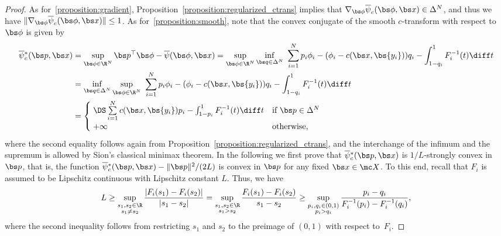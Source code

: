\documentclass[11pt, a4paper, oneside, reqno]{article}
\begin{document}
	\begin{proof}
		As for~\ref{proposition:gradient},  Proposition~\ref{proposition:regularized_ctrans} implies that $\nabla_{\bs \phi} \overline\psi_c(\bs \phi, \bs x) \in \Delta^N$, and thus we have $\| \nabla_{\bs \phi} \overline\psi_c(\bs \phi, \bs x) \| \leq 1$. As for~\ref{proposition:smooth}, note that the convex conjugate of the smooth $c$-transform with respect to $\bs \phi$ is given by
		\begin{align*}
		\overline\psi{}_c^*(\bs p, \bs x) &= \sup_{\bs \phi \in \R^N} \bs p^\top \bs \phi - \overline\psi(\bs \phi, \bs x) = \sup_{\bs \phi \in \R^N} \inf_{\bs q \in \Delta^N} ~ \sum_{i=1}^N p_i \phi_i - (\phi_i - c(\bs x, \bs {y_i})) q_i - \int_{1-q_i}^1 F_i^{-1}(t)\diff t \\
		&= \inf_{\bs q \in \Delta^N} \sup_{\bs \phi \in \R^N} ~ \sum_{i=1}^N p_i \phi_i - (\phi_i - c(\bs x, \bs {y_i})) q_i - \int_{1-q_i}^1 F_i^{-1}(t)\diff t \\
		&= \begin{cases}
		\;\DS \sum\limits_{i=1}^N c(\bs x, \bs {y_i}) p_i - \int_{1-p_i}^1 F_i^{-1}(t)\diff t &  \text{if } \bs p \in \Delta^N \\
		\;+\infty &  \text{otherwise,}
		\end{cases}
		\end{align*}
		where the second equality follows again from Proposition~\ref{proposition:regularized_ctrans}, and the interchange of the infimum and the supremum is allowed by Sion's classical minimax theorem. 
		In the following we first prove that $\overline\psi{}_c^*(\bs p, \bs x)$ is $1/L$-strongly convex in $\bs p$, that is, the function $\overline\psi{}_c^*(\bs p, \bs x) -  \| \bs p\|^2/ (2L)$ is convex in $\bs p$ for any fixed $\bs x \in \mc X$.
		To this end, recall that $F_i$ is assumed to be Lipschitz continuous with Lipschitz constant $L$. Thus, we have
		\begin{align*}
		    L\ge  \sup_{\substack{s_1,s_2 \in \R\\ s_1 \neq s_2}}\frac{\left| F_i (s_1) - F_i(s_2)\right|}{|s_1 - s_2|} 
	    	= \sup_{\substack{s_1, s_2 \in \R\\ s_1 > s_2}}\frac{ F_i (s_1) - F_i(s_2)}{s_1 - s_2}
		    \geq \sup_{\substack{p_i, q_i \in (0,1)\\ p_i > q_i}} \frac{p_i - q_i}{F_i^{-1}(p_i) - F_i^{-1}(q_i)},
		\end{align*}
		where the second inequality follows from restricting $s_1$ and $s_2$ to the preimage of $(0,1)$ with respect to~$F_i$. %

\end{proof}
\end{document}
